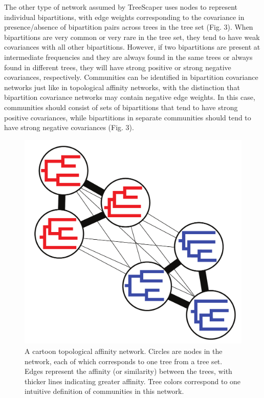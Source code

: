 \documentclass[11pt]{article}
\begin{document}
The other type of network assumed by TreeScaper uses nodes to represent individual bipartitions, with edge weights corresponding to the covariance in presence/absence of bipartition pairs across trees in the tree set (Fig. 3). When bipartitions are very common or very rare in the tree set, they tend to have weak covariances with all other bipartitions. However, if two bipartitions are present at intermediate frequencies and they are always found in the same trees or always found in different trees, they will have strong positive or strong negative covariances, respectively. Communities can be identified in bipartition covariance networks just like in topological affinity networks, with the distinction that bipartition covariance networks may contain negative edge weights. In this case, communities should consist of sets of bipartitions that tend to have strong positive covariances, while bipartitions in separate communities should tend to have strong negative covariances (Fig. 3). \\


\begin{figure}[thbp!]\centering
\includegraphics[scale=0.25]{imagesForManual/Figure2.pdf}
\caption{A cartoon topological affinity network. Circles are nodes in the network, each of which corresponds to one tree from a tree set. Edges represent the affinity (or similarity) between the trees, with thicker lines indicating greater affinity. Tree colors correspond to one intuitive definition of communities in this network.}\label{fig2}
\end{figure}
\end{document}
